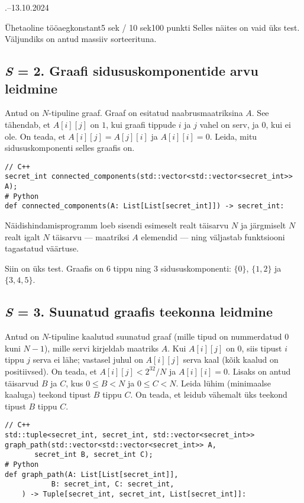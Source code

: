 \documentclass[a4paper,11pt]{article}
\begin{document}
\begin{ol}{\eio}{.--13.10.2024}{\yle}{}
\begin{yl}{7}{Ühetaoline tööaeg}{konstant}{5 sek / 10 sek}{100 punkti}
	\nde[1]{4cm}{4cm}
	Selles näites on vaid üks test. Väljundiks on antud massiiv sorteerituna.

	\subsection*{\emph{S} = 2. Graafi sidususkomponentide arvu leidmine}

	Antud on $N$-tipuline graaf. Graaf on esitatud naabrusmaatriksina $A$. See tähendab, et $A[i][j]$ on $1$, kui graafi tippude $i$ ja $j$ vahel on serv, ja $0$, kui ei ole. On teada, et $A[i][j] = A[j][i]$ ja $A[i][i] = 0$. Leida, mitu sidususkomponenti selles graafis on.

\begin{verbatim}
// C++
secret_int connected_components(std::vector<std::vector<secret_int>> A);
# Python
def connected_components(A: List[List[secret_int]]) -> secret_int:
\end{verbatim}

	Näidishindamisprogramm loeb sisendi esimeselt realt täisarvu $N$ ja järgmiselt $N$ realt igalt $N$ täisarvu --- maatriksi $A$ elemendid --- ning väljastab funktsiooni tagastatud väärtuse.

	\nde[2]{4cm}{4cm}
	Siin on üks test. Graafis on 6 tippu ning 3 sidususkomponenti: $\{0\}$, $\{1, 2\}$ ja $\{3, 4, 5\}$.

	\subsection*{\emph{S} = 3. Suunatud graafis teekonna leidmine}

	Antud on $N$-tipuline kaalutud suunatud graaf (mille tipud on nummerdatud $0$ kuni $N-1$), mille servi kirjeldab maatriks $A$. Kui $A[i][j]$ on $0$, siis tipust $i$ tippu $j$ serva ei lähe; vastasel juhul on $A[i][j]$ serva kaal (kõik kaalud on positiivsed). On teada, et $A[i][j] < 2^{32}/N$ ja $A[i][i] = 0$. Lisaks on antud täisarvud $B$ ja $C$, kus $0 \le B < N$ ja $0 \le C < N$. Leida lühim (minimaalse kaaluga) teekond tipust $B$ tippu $C$. On teada, et leidub vähemalt üks teekond tipust $B$ tippu $C$.

\begin{verbatim}
// C++
std::tuple<secret_int, secret_int, std::vector<secret_int>>
graph_path(std::vector<std::vector<secret_int>> A,
	   secret_int B, secret_int C);
# Python
def graph_path(A: List[List[secret_int]],
	       B: secret_int, C: secret_int,
	) -> Tuple[secret_int, secret_int, List[secret_int]]:
\end{verbatim}


\end{yl}
\end{ol}
\end{document}
